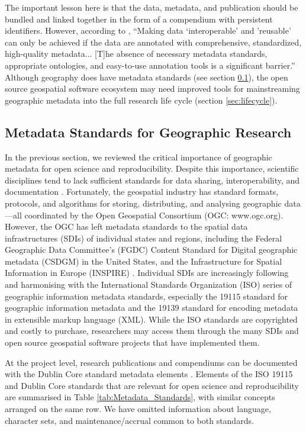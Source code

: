 \documentclass{isprs} %
\begin{document}
The important lesson here is that the data, metadata, and publication should be bundled and linked together in the form of a compendium with persistent identifiers.
However, according to \citet[137-8]{NASEM2018}, ``Making data `interoperable' and 'reusable' can only be achieved if the data are annotated with comprehensive, standardized, high-quality metadata... [T]he absence of necessary metadata standards, appropriate ontologies, and easy-to-use annotation tools is a significant barrier.''
Although geography does have metadata standards (see section \ref{sec:Metadata}), the open source geospatial software ecosystem may need improved tools for mainstreaming geographic metadata into the full research life cycle (section \ref{sec:lifecycle}).

\subsection{Metadata Standards for Geographic Research}\label{sec:Metadata}

In the previous section, we reviewed the critical importance of geographic metadata for open science and reproducibility.
Despite this importance, scientific disciplines tend to lack sufficient standards for data sharing, interoperability, and documentation \citep{NASEM2019}.
Fortunately, the geospatial industry has standard formats, protocols, and algorithms for storing, distributing, and analysing geographic data---all coordinated by the Open Geospatial Consortium (OGC: www.ogc.org).
However, the OGC has left metadata standards to the spatial data infrastructures (SDIs) of individual states and regions, including the Federal Geographic Data Committee's (FGDC) Content Standard for Digital geographic metadata (CSDGM) in the United States, and the Infrastructure for Spatial Information in Europe (INSPIRE) \citep{Kim1999,Bartha2011}.
Individual SDIs are increasingly following and harmonising with the International Standards Organization (ISO) series of geographic information metadata standards, especially the 19115 standard \citep{ISO2014} for geographic information metadata and the 19139 standard \citep{ISO2019} for encoding metadata in extensible markup language (XML).
While the ISO standards are copyrighted and costly to purchase, researchers may access them through the many SDIs and open source geospatial software projects that have implemented them.

At the project level, research publications and compendiums can be documented with the Dublin Core\texttrademark{}  standard metadata elements \citep{DCMI2005}. Elements of the ISO 19115 and Dublin Core standards that are relevant for open science and reproducibility are summarised in Table \ref{tab:Metadata_Standards}, with similar concepts arranged on the same row. We have omitted information about language, character sets, and maintenance/accrual common to both standards.
\end{document}
